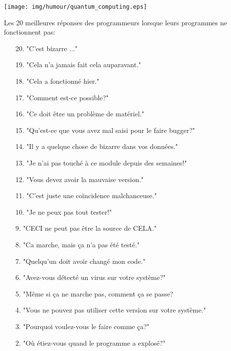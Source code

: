 \begin{center}\underline{\hspace{5 cm}}\end{center}	

	\begin{center}
	\texttt{[image: img/humour/quantum\_computing.eps]}
	\end{center}
	
\begin{center}\underline{\hspace{5 cm}}\end{center}

Les 20 meilleures réponses des programmeurs lorsque leurs programmes ne fonctionnent pas:
	\begin{enumerate}[nolistsep]
		\item[20.] "C'est bizarre ..."
		\item[19.] "Cela n'a jamais fait cela auparavant."
		\item[18.] "Cela a fonctionné hier."
		\item[17.] "Comment est-ce possible?"
		\item[16.] "Ce doit être un problème de matériel."
		\item[15.] "Qu'est-ce que vous avez mal saisi pour le faire bugger?"
		\item[14.] "Il y a quelque chose de bizarre dans vos données."
		\item[13.] "Je n'ai pas touché à ce module depuis des semaines!"
		\item[12.] "Vous devez avoir la mauvaise version."
		\item[11.] "C'est juste une coïncidence malchanceuse."
		\item[10.] "Je ne peux pas tout tester!"
		\item[9.] "CECI ne peut pas être la source de CELA."
		\item[8.] "Ca marche, mais ça n'a pas été testé."
		\item[7.] "Quelqu'un doit avoir changé mon code."
		\item[6.] "Avez-vous détecté un virus sur votre système?"
		\item[5.] "Même si ça ne marche pas, comment ça se passe?
		\item[4.] "Vous ne pouvez pas utiliser cette version sur votre système."
		\item[3.] "Pourquoi voulez-vous le faire comme ça?"
		\item[2.] "Où étiez-vous quand le programme a explosé?"
	\end{enumerate}

